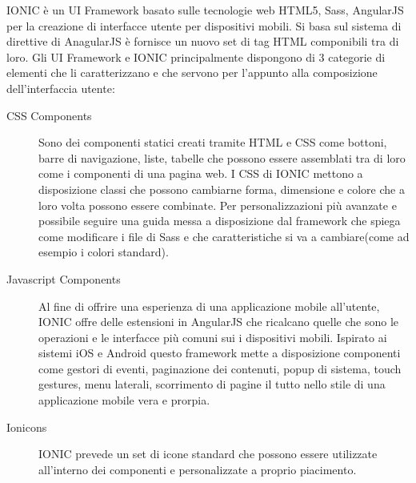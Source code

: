 IONIC è un UI Framework basato sulle tecnologie web HTML5, Sass, AngularJS per la creazione di interfacce utente per dispositivi mobili. Si basa sul sistema di direttive di AnagularJS è fornisce un nuovo set di tag HTML componibili tra di loro. 
Gli UI Framework e IONIC principalmente dispongono di 3 categorie di elementi che li caratterizzano e che servono per l'appunto alla composizione dell'interfaccia utente:

\begin{description}

\item[CSS Components] Sono dei componenti statici creati tramite HTML e CSS come bottoni, barre di navigazione, liste, tabelle che possono essere assemblati tra di loro come i componenti di una pagina web. I CSS di IONIC mettono a disposizione classi che possono cambiarne forma, dimensione e colore che a loro volta possono essere combinate.
Per personalizzazioni più avanzate e possibile seguire una guida messa a disposizione dal framework che spiega come modificare i file di Sass e che caratteristiche si va a cambiare(come ad esempio i colori standard).

\item[Javascript Components] Al fine di offrire una esperienza di una applicazione mobile all'utente, IONIC offre delle estensioni in AngularJS che ricalcano quelle che sono le operazioni e le interfacce più comuni sui i dispositivi mobili. Ispirato ai sistemi iOS e Android questo framework mette a disposizione componenti come gestori di eventi, paginazione dei contenuti, popup di sistema, touch gestures, menu laterali, scorrimento di pagine il tutto nello stile di una applicazione mobile vera e prorpia.

\item[Ionicons] IONIC prevede un set di icone standard che possono essere utilizzate all'interno dei componenti e personalizzate a proprio piacimento.

\end{description} 

